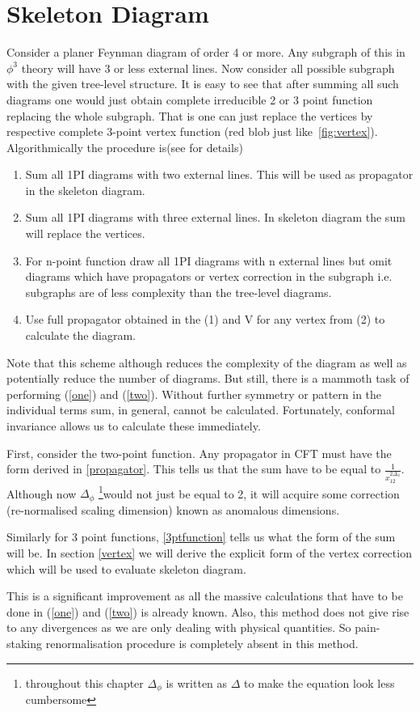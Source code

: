 \documentclass[12pt,a4paper,oneside]{book}
\theoremstyle{definition}
\begin{document}
    \section{Skeleton Diagram}
    Consider a planer Feynman diagram of order 4 or more. Any subgraph of this in $\phi^3$ theory will have 3 or less external lines. Now consider all possible subgraph with the given tree-level structure. It is easy to see that after summing all such diagrams one would just obtain complete irreducible 2 or 3 point function replacing the whole subgraph. That is one can just replace the vertices by respective complete 3-point vertex function (red blob just like~\ref{fig:vertex}). Algorithmically the procedure is(see \cite{srednicki} for details)
    \begin{enumerate}
        \item Sum all 1PI diagrams with two external lines. This will be used as propagator in the skeleton diagram.\label{one}
        \item Sum all 1PI diagrams with three external lines. In skeleton diagram the sum will replace the vertices.\label{two}
        \item For n-point function draw all 1PI diagrams with n external lines but omit diagrams which have propagators or vertex correction in the subgraph i.e. subgraphs are of less complexity than the tree-level diagrams.
        \item Use full propagator obtained in the (1) and V for any vertex from (2) to calculate the diagram.
    \end{enumerate}
    Note that this scheme although reduces the complexity of the diagram as well as potentially reduce the number of diagrams. But still, there is a mammoth task of performing (\ref{one}) and (\ref{two}). Without further symmetry or pattern in the individual terms sum, in general, cannot be calculated. Fortunately, conformal invariance allows us to calculate these immediately. \par
    First, consider the two-point function. Any propagator in CFT must have the form derived in \ref{propagator}. This tells us that the sum have to be equal to $\frac{1}{x_{12}^{2\Delta_{\phi}}}$. Although now $\Delta_{\phi}$ \footnote{throughout this chapter $\Delta_{\phi}$ is written as $\Delta$ to make the equation look less cumbersome}would not just be equal to 2, it will acquire some correction (re-normalised scaling dimension) known as anomalous dimensions.\par
    Similarly for 3 point functions, \ref{3ptfunction} tells us what the form of the sum will be. In section \ref{vertex} we will derive the explicit form of the vertex correction which will be used to evaluate skeleton diagram.\par
    This is a significant improvement as all the massive calculations that have to be done in (\ref{one}) and (\ref{two}) is already known. Also, this method does not give rise to any divergences as we are only dealing with physical quantities. So pain-staking renormalisation procedure is completely absent in this method.
\end{document}
